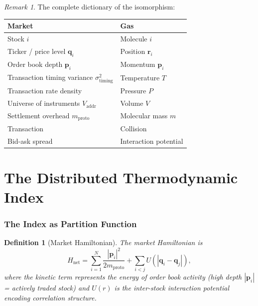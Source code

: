 \documentclass[twocolumn,10pt]{article}
\newtheorem{definition}[theorem]{Definition}
\theoremstyle{remark}
\newtheorem{remark}[theorem]{Remark}
\newcommand{\Vaddr}{V_{\mathrm{addr}}}
\newcommand{\mproto}{m_{\mathrm{proto}}}
\newcommand{\Hnet}{H_{\mathrm{net}}}
\begin{document}
\begin{remark}
The complete dictionary of the isomorphism:
\begin{center}
\begin{tabular}{@{}ll@{}}
\toprule
\textbf{Market} & \textbf{Gas} \\
\midrule
Stock $i$ & Molecule $i$ \\
Ticker / price level $\mathbf{q}_i$ & Position $\mathbf{r}_i$ \\
Order book depth $\mathbf{p}_i$ & Momentum $\mathbf{p}_i$ \\
Transaction timing variance $\sigma^2_{\mathrm{timing}}$ & Temperature $T$ \\
Transaction rate density & Pressure $P$ \\
Universe of instruments $\Vaddr$ & Volume $V$ \\
Settlement overhead $\mproto$ & Molecular mass $m$ \\
Transaction & Collision \\
Bid-ask spread & Interaction potential \\
\bottomrule
\end{tabular}
\end{center}
\end{remark}


\part{The Distributed Thermodynamic Index}

\section{The Index as Partition Function}
\label{sec:partition_function}

\begin{definition}[Market Hamiltonian]
\label{def:market_hamiltonian}
The \emph{market Hamiltonian} is
\begin{equation}
    \Hnet = \sum_{i=1}^{N} \frac{|\mathbf{p}_i|^2}{2\mproto} + \sum_{i < j} U(|\mathbf{q}_i - \mathbf{q}_j|),
    \label{eq:market_hamiltonian}
\end{equation}
where the kinetic term represents the energy of order book activity (high depth $|\mathbf{p}_i|$ = actively traded stock) and $U(r)$ is the inter-stock interaction potential encoding correlation structure.
\end{definition}
\end{document}
